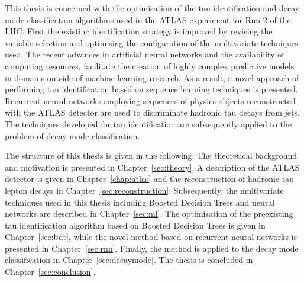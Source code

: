 This thesis is concerned with the optimisation of the tau identification and
decay mode classification algorithms used in the ATLAS experiment for Run 2 of
the LHC. First the existing identification strategy is improved by revising the
variable selection and optimising the configuration of the multivariate
techniques used. The recent advances in artificial neural networks and the
availability of computing resources, facilitate the creation of highly complex
predictive models in domains outside of machine learning research. As a result,
a novel approach of performing tau identification based on sequence learning
techniques is presented. Recurrent neural networks employing sequences of
physics objects reconstructed with the ATLAS detector are used to discriminate
hadronic tau decays from jets. The techniques developed for tau identification
are subsequently applied to the problem of decay mode classification.

The structure of this thesis is given in the following. The theoretical
background and motivation is presented in Chapter~\ref{sec:theory}. A
description of the ATLAS detector is given in Chapter~\ref{chap:atlas} and the
reconstruction of hadronic tau lepton decays in
Chapter~\ref{sec:reconstruction}. Subsequently, the multivariate techniques used
in this thesis including Boosted Decision Trees and neural networks are
described in Chapter~\ref{sec:ml}. The optimisation of the preexisting tau
identification algorithm based on Boosted Decision Trees is given in
Chapter~\ref{sec:bdt}, while the novel method based on recurrent neural networks
is presented in Chapter~\ref{sec:rnn}. Finally, the method is applied to the
decay mode classification in Chapter~\ref{sec:decaymode}. The thesis is
concluded in Chapter~\ref{sec:conclusion}.









